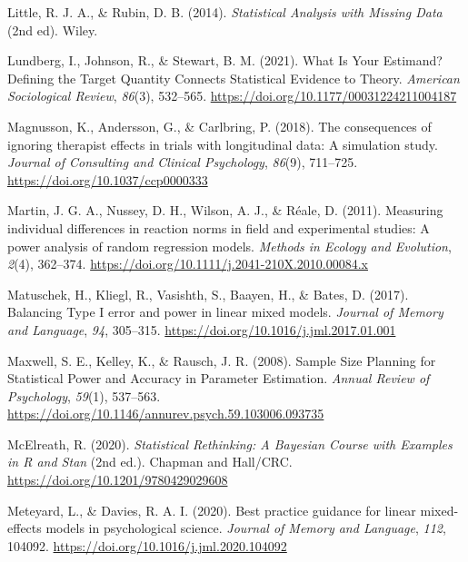 \documentclass[
  man,
  floatsintext,
  longtable,
  a4paper,
  nolmodern,
  notxfonts,
  notimes,
  colorlinks=true,linkcolor=blue,citecolor=blue,urlcolor=blue]{apa7}
\newlength{\cslhangindent}
\newenvironment{CSLReferences}[2] %
 {\begin{list}{}{%
  \setlength{\itemindent}{0pt}
  \setlength{\leftmargin}{0pt}
  \setlength{\parsep}{0pt}
  \ifodd #1
   \setlength{\leftmargin}{\cslhangindent}
   \setlength{\itemindent}{-1\cslhangindent}
  \fi
  \setlength{\itemsep}{#2\baselineskip}}}
 {\end{list}}
\begin{document}
\begin{CSLReferences}{1}{0}
Little, R. J. A., \& Rubin, D. B. (2014). \emph{Statistical {Analysis}
with {Missing Data}} (2nd ed). Wiley.

Lundberg, I., Johnson, R., \& Stewart, B. M. (2021). What {Is Your
Estimand}? {Defining} the {Target Quantity Connects Statistical
Evidence} to {Theory}. \emph{American Sociological Review},
\emph{86}(3), 532--565. \url{https://doi.org/10.1177/00031224211004187}

Magnusson, K., Andersson, G., \& Carlbring, P. (2018). The consequences
of ignoring therapist effects in trials with longitudinal data: {A}
simulation study. \emph{Journal of Consulting and Clinical Psychology},
\emph{86}(9), 711--725. \url{https://doi.org/10.1037/ccp0000333}

Martin, J. G. A., Nussey, D. H., Wilson, A. J., \& Réale, D. (2011).
Measuring individual differences in reaction norms in field and
experimental studies: A power analysis of random regression models.
\emph{Methods in Ecology and Evolution}, \emph{2}(4), 362--374.
\url{https://doi.org/10.1111/j.2041-210X.2010.00084.x}

Matuschek, H., Kliegl, R., Vasishth, S., Baayen, H., \& Bates, D.
(2017). Balancing {Type I} error and power in linear mixed models.
\emph{Journal of Memory and Language}, \emph{94}, 305--315.
\url{https://doi.org/10.1016/j.jml.2017.01.001}

Maxwell, S. E., Kelley, K., \& Rausch, J. R. (2008). Sample {Size
Planning} for {Statistical Power} and {Accuracy} in {Parameter
Estimation}. \emph{Annual Review of Psychology}, \emph{59}(1), 537--563.
\url{https://doi.org/10.1146/annurev.psych.59.103006.093735}

McElreath, R. (2020). \emph{Statistical {Rethinking}: {A Bayesian
Course} with {Examples} in {R} and {Stan}} (2nd ed.). {Chapman and
Hall/CRC}. \url{https://doi.org/10.1201/9780429029608}

Meteyard, L., \& Davies, R. A. I. (2020). Best practice guidance for
linear mixed-effects models in psychological science. \emph{Journal of
Memory and Language}, \emph{112}, 104092.
\url{https://doi.org/10.1016/j.jml.2020.104092}


\end{CSLReferences}
\end{document}

